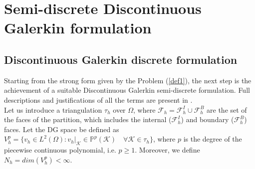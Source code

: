\documentclass[a4paper,11pt]{article}
\begin{document}
   
\newpage

    \section{Semi-discrete Discontinuous Galerkin formulation}
    \subsection{Discontinuous Galerkin discrete formulation}
    Starting from the strong form given by the Problem (\ref{def1}), the next step is the achievement of a suitable Discontinuous Galerkin semi-discrete formulation. Full descriptions and justifications of all the terms are present in \cite{marta} . \\
    Let us introduce a triangulation $\tau_h$ over $\Omega$, where $\mathcal{F} _h=\mathcal{F} _h^I \cup \mathcal{F} _h^B$ are the set of the faces of the partition, which includes the internal ($\mathcal{F} _h^I$) and boundary ($\mathcal{F} _h^B$) faces. Let the DG space be defined as $V_h^p = \{v_h \in L^2(\Omega) : v_h|_\mathcal{K} \in \mathbb{P}^{p}(\mathcal{K})  \quad \forall \mathcal{K} \in \tau_h \}$, where $p$ is the degree of the piecewise continuous polynomial, i.e. $p \geq 1$. Moreover, we define $N_h=dim(V_h^p)<\infty$. \vspace{4mm}
\end{document}
